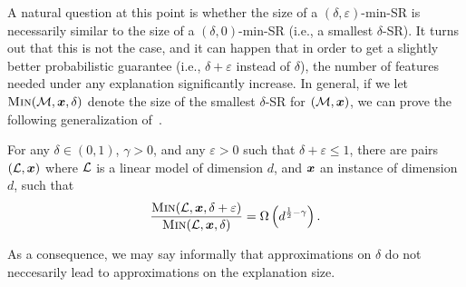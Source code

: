 
A natural question at this point is whether the size of a $(\delta, \varepsilon)$-min-SR is necessarily similar to the size of a $(\delta, 0)$-min-SR (i.e., a smallest $\delta$-SR). It turns out that this is not the case, and it can happen that in order to get a slightly better probabilistic guarantee (i.e., $\delta + \varepsilon$ instead of $\delta$), the number of features needed under any explanation significantly increase.
In general, if we let $\operatorname{\textnormal{\textsc{Min}}}(\mathcal{M}, {\bm{x}}, \delta)$ denote the size of the smallest $\delta$-SR for $(\mathcal{M}, {\bm{x}})$, we can prove the following  generalization of~.

\begin{proposition}\label{prop:delta-sr-size}
For any $\delta \in (0, 1)$, $\gamma > 0$, and any $\varepsilon > 0$ such that $\delta + \varepsilon \leq 1$, there are pairs $(\mathcal{L}, {\bm{x}})$ where $\mathcal{L}$ is a linear model of dimension $d$, and ${\bm{x}}$ an instance of dimension $d$, such that
	\[ 
		\frac{\operatorname{\textnormal{\textsc{Min}}}(\mathcal{L}, {\bm{x}}, \delta+\varepsilon)}{\operatorname{\textnormal{\textsc{Min}}}(\mathcal{L}, {\bm{x}}, \delta)} = \Omega\left(d^{\frac{1}{2} - \gamma}\right).
	\]
\end{proposition}

As a consequence, we may say informally that approximations on $\delta$ do not neccesarily lead to approximations on the explanation size.

